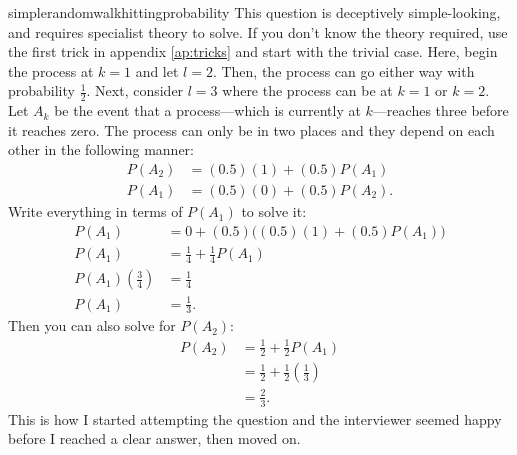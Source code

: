 \begin{answer}{simplerandomwalkhittingprobability}
This question is deceptively simple-looking, and requires specialist theory to solve.
If you don't know the theory required, use the first trick in appendix \ref{ap:tricks} and start with the trivial case.
Here, begin the process at $k=1$ and let $l=2$.
Then, the process can go either way with probability $\frac{1}{2}$.
Next, consider $l=3$ where the process can be at $k=1$ or $k=2$.
Let $A_k$ be the event that a process---which is currently at $k$---reaches three before it reaches zero.
The process can only be in two places and they depend on each other in the following manner:
\begin{align*}
P(A_2) &= (0.5)(1) + (0.5)P(A_1)  \\
P(A_1) &= (0.5)(0) + (0.5)P(A_2)
\text{.}
\end{align*}
Write everything in terms of $P(A_1)$ to solve it:
\begin{align*}
P(A_1) &= 0 + (0.5) \Big((0.5)(1) + (0.5) P(A_1)\Big) \\
P(A_1) &= \frac{1}{4} + \frac{1}{4}P(A_1) \\
P(A_1) \left(\frac{3}{4}\right)&= \frac{1}{4} \\
P(A_1) &= \frac{1}{3}
\text{.}
\end{align*}
Then you can also solve for $P(A_2)$:
\begin{align*}
P(A_2) &= \frac{1}{2} + \frac{1}{2} P(A_1)  \\
       &= \frac{1}{2} + \frac{1}{2}\left(\frac{1}{3}\right) \\
       &= \frac{2}{3}
\text{.}
\end{align*}
This is how I started attempting the question and the interviewer seemed happy before I reached a clear answer, then moved on.


\end{answer}
